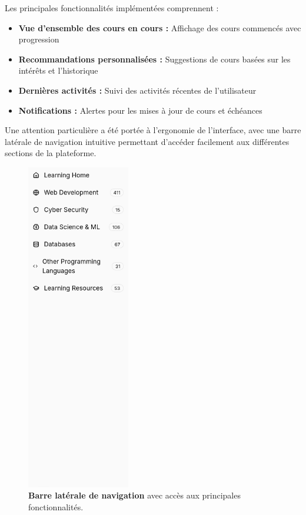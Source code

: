 Les principales fonctionnalités implémentées comprennent :
\begin{itemize}
  \item \textbf{Vue d'ensemble des cours en cours :} Affichage des cours commencés avec progression
  \item \textbf{Recommandations personnalisées :} Suggestions de cours basées sur les intérêts et l'historique
  \item \textbf{Dernières activités :} Suivi des activités récentes de l'utilisateur
  \item \textbf{Notifications :} Alertes pour les mises à jour de cours et échéances
\end{itemize}

Une attention particulière a été portée à l'ergonomie de l'interface, avec une barre latérale de navigation intuitive permettant d'accéder facilement aux différentes sections de la plateforme.

\begin{figure}[H]
  \centering
  \includegraphics[width=0.4\textwidth,keepaspectratio]{week_3_img/sidebare.png}
  \caption{\textbf{Barre latérale de navigation} avec accès aux principales fonctionnalités.}
  \label{fig:sidebar}
\end{figure}

